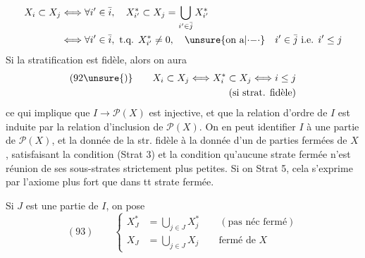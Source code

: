 
\[
\begin{aligned}
X_i\subset X_j&\Longleftrightarrow\forall i'\in\bar i,\quad X_{i'}^*\subset X_j=\bigcup_{i'\in\bar j}X_{i'}^*\\
&\Longleftrightarrow\forall i'\in\bar i,\text{ t.q. }X_{i'}^*\neq0,\quad\unsure{\text{on a}|\mathord{\cdot}\mathord{-}\mathord{\cdot}}\quad i'\in\bar j\text{ i.e. }i'\leq j
\end{aligned}
\]
Si la stratification est fidèle, alors on aura 
\[
\begin{aligned}
(92\unsure{)}\qquad X_i\subset X_j\Longleftrightarrow X_i^*\subset X_j\Longleftrightarrow i\leq j&\\
(\text{si strat. fidèle})&
\end{aligned}
\]
ce qui implique que $I\longrightarrow\mathcal P(X)$ est injective, et que la relation d'ordre de $I$ est induite par la relation d'inclusion de $\mathcal P(X)$. On en peut identifier $I$ à une partie de $\mathcal P(X)$, et la donnée de la str. fidèle à la donnée d'un   de parties fermées  de $X$,  satisfaisant la condition (Strat 3)  et la condition qu'aucune strate fermée n'est réunion de ses sous-strates strictement plus petites. Si on  Strat 5, cela s'exprime par l'axiome plus fort que dans tt strate fermée.

Si $J$ est une partie de $I$, on pose
\[
(93)\qquad\left\{
\begin{aligned}
X_J^*&=\bigcup_{j\in J}X_j^*\qquad(\text{pas néc fermé})\\
X_J&=\bigcup_{j\in J}X_j\qquad\text{fermé de }X
\end{aligned}\right.
\]

